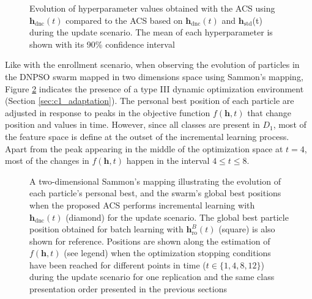 \begin{figure}[ht]
  \centering
	\caption{Evolution of hyperparameter values obtained with the ACS using $\textbf{h}_\text{dnc}(t)$ compared to the ACS based on $\textbf{h}_\text{dnc}(t)$ and $\textbf{h}_\text{std}$(t) during the update scenario. The mean of each hyperparameter is shown with its 90\% confidence interval}
	\label{fig:c1_RefDynHp}
\end{figure}

Like with the enrollment scenario, when observing the evolution of particles in the DNPSO swarm mapped in two dimensions space using Sammon's mapping, Figure \ref{fig:c1_RefDynSwarm} indicates the presence of a type III dynamic optimization environment (Section \ref{sec:c1_adaptation}). The personal best position of each particle are adjusted in response to peaks in the objective function $f(\textbf{h},t)$ that change position and values in time. However, since all classes are present in $D_1$, most of the feature space is define at the outset of the incremental learning process. Apart from the peak appearing in the middle of the optimization space at $t=4$, most of the changes in $f(\textbf{h},t)$ happen in the interval $4\leq t\leq8$.

\begin{figure}[ht]
  \centering
	\caption{A two-dimensional Sammon's mapping illustrating the evolution of each particle's personal best, and the swarm's global best positions when the proposed ACS performs incremental learning with $\textbf{h}_\text{dnc}(t)$ (diamond) for the update scenario. The global best particle position obtained for batch learning with $\textbf{h}_\text{ro}^B(t)$ (square) is also shown for reference. Positions are shown along the estimation of $f(\textbf{h},t)$ (see legend) when the optimization stopping conditions have been reached for different points in time ($t\in\{1,4,8,12\}$) during the update scenario for one replication and the same class presentation order presented in the previous sections}
	\label{fig:c1_RefDynSwarm}
\end{figure}

